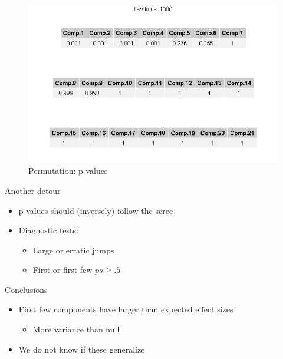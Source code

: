 \documentclass[
  ignorenonframetext,
]{beamer}
\providecommand{\tightlist}{%
  \setlength{\itemsep}{0pt}\setlength{\parskip}{0pt}}
\begin{document}
\begin{frame}

\begin{figure}
\centering
\includegraphics{../Images/Perm5.png}
\caption{Permutation: p-values}
\end{figure}

\end{frame}

\begin{frame}{Another detour}
\protect\hypertarget{another-detour}{}

\begin{itemize}[<+->]
\tightlist
\item
  p-values should (inversely) follow the scree
\item
  Diagnostic tests:

  \begin{itemize}[<+->]
  \tightlist
  \item
    Large or erratic jumps
  \item
    First or first few \(ps \geq .5\)
  \end{itemize}
\end{itemize}

\end{frame}

\begin{frame}{Conclusions}
\protect\hypertarget{conclusions}{}

\begin{itemize}[<+->]
\tightlist
\item
  First few components have larger than expected effect sizes

  \begin{itemize}[<+->]
  \tightlist
  \item
    More variance than null
  \end{itemize}
\item
  We do not know if these generalize
\end{itemize}

\end{frame}
\end{document}
